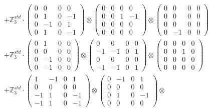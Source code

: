 \documentclass{article}
\begin{document}
{\begin{align}
        &+ \label{Rs16-Rc11-Solution-16-c22} \mathbb{Z}_3^{std} \cdot 
            \begin{pmatrix} 0 & 0 & 0 & 0 \\ 0 & 1 & 0 & -1 \\ 0 & -1 & 0 & 1 \\ 0 & 1 & 0 & -1 \end{pmatrix} \otimes 
            \begin{pmatrix} 0 & 0 & 0 & 0 \\ 0 & 0 & 1 & -1 \\ 0 & 0 & 0 & 0 \\ 0 & 0 & 0 & 0 \end{pmatrix} \otimes 
            \begin{pmatrix} 0 & 0 & 0 & 0 \\ 0 & 0 & 0 & 0 \\ 0 & 0 & 0 & 0 \\ 0 & -1 & 0 & 0 \end{pmatrix} \\ 
        &+ \label{Rs16-Rc11-Solution-16-c23} \mathbb{Z}_3^{std} \cdot 
            \begin{pmatrix} 0 & 1 & 0 & 0 \\ 0 & 0 & 0 & 0 \\ 0 & -1 & 0 & 0 \\ 0 & -1 & 0 & 0 \end{pmatrix} \otimes 
            \begin{pmatrix} 0 & 0 & 0 & 0 \\ -1 & -1 & 0 & 1 \\ 0 & 0 & 0 & 0 \\ -1 & -1 & 0 & 1 \end{pmatrix} \otimes 
            \begin{pmatrix} 0 & 0 & 0 & 0 \\ 0 & 0 & 1 & 0 \\ 0 & 0 & 0 & 0 \\ 0 & 0 & 0 & 0 \end{pmatrix} \\ 
        &+ \label{Rs16-Rc11-Solution-16-c24} \mathbb{Z}_3^{std} \cdot 
            \begin{pmatrix} 1 & -1 & 0 & 1 \\ 0 & 0 & 0 & 0 \\ -1 & 1 & 0 & -1 \\ -1 & 1 & 0 & -1 \end{pmatrix} \otimes 
            \begin{pmatrix} 0 & -1 & 0 & 1 \\ 0 & 0 & 0 & 0 \\ 0 & 1 & 0 & -1 \\ 0 & 0 & 0 & 0 \end{pmatrix} \otimes 

\end{align}}
\end{document}
